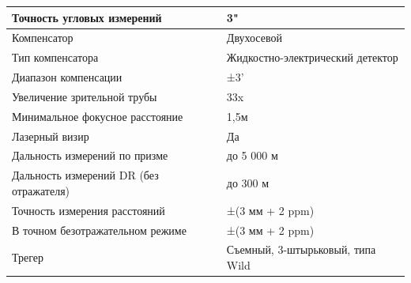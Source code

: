 \documentclass[a4paper]{article}
\begin{document}
\begin{newpage}
\begin{center}
        \begin{tabular}{ | p{200pt} | p{260pt} | }
            \hline
            Точность угловых измерений & 3"\\
            \hline
            Компенсатор &Двухосевой\\
            \hline
            Тип компенсатора & Жидкостно-электрический детектор\\
            \hline
            Диапазон компенсации & ±3'\\
            \hline
            Увеличение зрительной трубы & 33x\\
            \hline
            Минимальное фокусное расстояние  & 1,5м\\
            \hline
            Лазерный визир & Да\\
            \hline
            Дальность измерений по призме & до 5 000 м\\
            \hline
            Дальность измерений DR (без отражателя)  & до 300 м\\
            \hline
            Точность измерения расстояний & ±(3 мм + 2 ppm)\\
            \hline
            В точном безотражательном режиме & ±(3 мм + 2 ppm)\\
            \hline
            Трегер & Съемный, 3-штырьковый, типа Wild\\
            \hline
        \end{tabular}
    \end{center}

\end{newpage}
\end{document}
